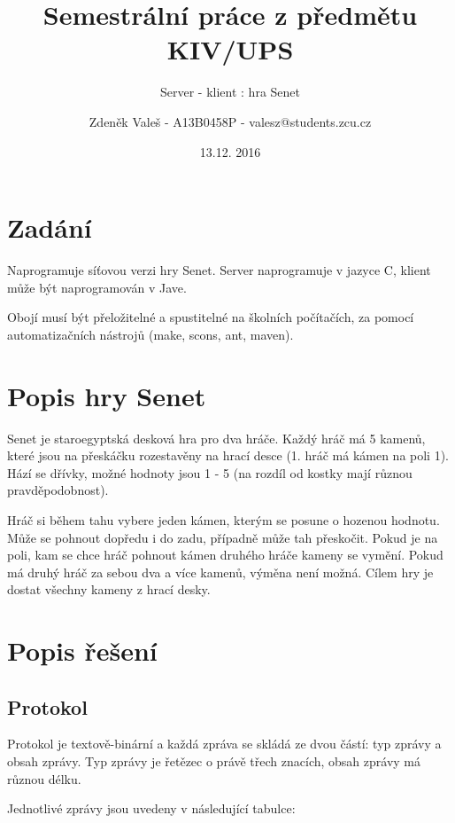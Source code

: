 \documentclass[11pt,a4paper]{scrartcl}
\begin{document}
	\title{Semestrální práce z předmětu KIV/UPS}
	\subtitle{Server - klient : hra Senet}
	\author{Zdeněk Valeš - A13B0458P - valesz@students.zcu.cz}
	\date{13.12. 2016}
	\maketitle
	\newpage
	
	\section{Zadání}
	Naprogramuje síťovou verzi hry Senet. Server naprogramuje v jazyce C, klient může být naprogramován v Jave.
	
	Obojí musí být přeložitelné a spustitelné na školních počítačích, za pomocí automatizačních nástrojů (make, scons, ant, maven).
	
	\section{Popis hry Senet}
	Senet je staroegyptská desková hra pro dva hráče. Každý hráč má 5 kamenů, které jsou na přeskáčku rozestavěny na hrací desce (1. hráč má kámen na poli 1). Hází se dřívky, možné hodnoty jsou 1 - 5 (na rozdíl od kostky mají různou pravděpodobnost). 
	
	Hráč si během tahu vybere jeden kámen, kterým se posune o hozenou hodnotu. Může se pohnout dopředu i do zadu, případně může tah přeskočit. Pokud je na poli, kam se chce hráč pohnout kámen druhého hráče kameny se vymění. Pokud má druhý hráč za sebou dva a více kamenů, výměna není možná. Cílem hry je dostat všechny kameny z hrací desky.
	
	\section{Popis řešení}
	
	\subsection{Protokol}
	Protokol je textově-binární a každá zpráva se skládá ze dvou částí: typ zprávy a obsah zprávy. Typ zprávy je řetězec o právě třech znacích, obsah zprávy má různou délku.
	
	Jednotlivé zprávy jsou uvedeny v následující tabulce:
	
\end{document}
